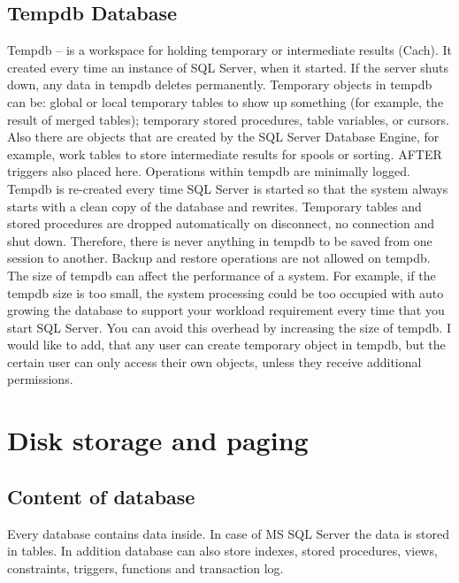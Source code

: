 \documentclass[english]{article}
\begin{document}
\subsection{Tempdb Database}

Tempdb – is a workspace for holding temporary or intermediate results (Cach). It created every time an instance of SQL Server, when it started. If the server shuts down, any data in tempdb deletes permanently. Temporary objects in tempdb can be: global or local temporary tables to show up something (for example, the result of merged tables); temporary stored procedures, table variables, or cursors. Also there are objects that are created by the SQL Server Database Engine, for example, work tables to store intermediate results for spools or sorting. AFTER triggers also placed here.
Operations within tempdb are minimally logged. Tempdb is re-created every time SQL Server is started so that the system always starts with a clean copy of the database and rewrites. Temporary tables and stored procedures are dropped automatically on disconnect, no connection and shut down. Therefore, there is never anything in tempdb to be saved from one session to another. Backup and restore operations are not allowed on tempdb.
The size of tempdb can affect the performance of a system. For example, if the tempdb size is too small, the system processing could be too occupied with auto growing the database to support your workload requirement every time that you start SQL Server. You can avoid this overhead by increasing the size of tempdb.
I would like to add, that any user can create temporary object in tempdb, but the certain user can only access their own objects, unless they receive additional permissions.

\section{Disk storage and paging}

\subsection{Content of database}
Every database contains data inside. In case of MS SQL Server the data is stored in tables. In addition database can also store indexes, stored procedures, views, constraints, triggers, functions and transaction log.
\end{document}
